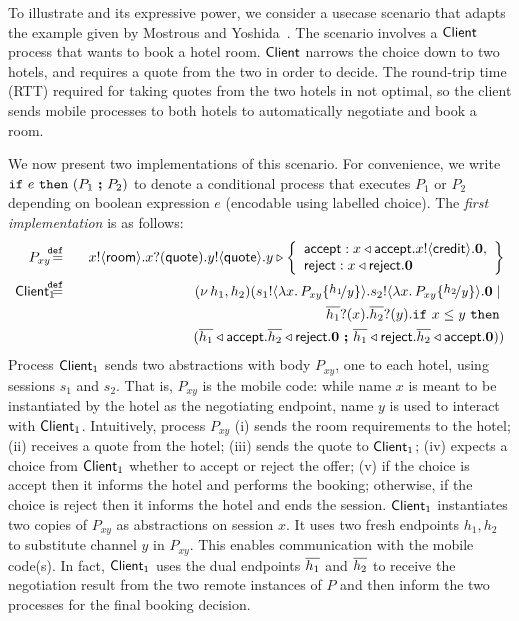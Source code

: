 \begin{example}\label{exam:proc}
To illustrate \HOp and its expressive power, 
we consider a usecase scenario that adapts the example given by Mostrous and Yoshida~\cite{tlca07,MostrousY15}.
The scenario involves a $\mathsf{Client}$ process that wants to book
a hotel room. %
$\mathsf{Client}$
narrows the choice down to two hotels, and requires 
 a quote from the two in order to
decide. The round-trip time (RTT) required for
taking quotes from the two hotels in not optimal, %
so the client sends mobile processes to both hotels
to automatically negotiate and book a room. 

We now present two \HOp implementations of this scenario.
For convenience, we write $\mathtt{if}\  e\ \mathtt{then}\  (P_1\ \boldsymbol{;} \ P_2)$ 
to denote a conditional process that executes $P_1$ or $P_2$ depending on boolean expression $e$ (encodable using labelled choice).
The \emph{first implementation} is  as follows:
%
	\begin{eqnarray*}%
		 P_{xy}  \!\!\! & \defeq &  \!\!\! \bout{x}{\rtype} \binp{x}{\Quote} \bout{y}{\Quote}
		y \triangleright \left\{
				\begin{array}{l}
					\accept: \bsel{x}{\accept} \bout{x}{\creditc} \inact,\\
					\reject: \bsel{x}{\reject} \inact
				\end{array}
				\right\}
		\\ %
		 \Client_1 \!\!\!\!\! & \defeq  &  \!\!\! \newsp{h_1, h_2}{\bout{s_1}{\abs{x}{P_{xy} \subst{h_1}{y}}} \bout{s_2}{\abs{x}{P_{xy} \subst{h_2}{y}}} \inact \Par  \\
		& & 
		\qquad \qquad\binp{\dual{h_1}}{x} \binp{\dual{h_2}}{y}  \If x \leq y\   \Then\\
		& & \qquad\qquad \qquad \qquad (\bsel{\dual{h_1}}{\accept} \bsel{\dual{h_2}}{\reject} \inact \ \Else \ \bsel{\dual{h_1}}{\reject} \bsel{\dual{h_2}}{\accept} \inact )
		}
	\end{eqnarray*}
%
Process $\mathsf{Client}_1$ sends two abstractions with body $P_{xy}$, one to each hotel, 
		using sessions $s_1$ and $s_2$.
		That is, $P_{xy}$ is the mobile code:
	while
		name $x$ is meant to be instantiated by the hotel as the negotiating
		endpoint, name $y$ is used to interact with $\mathsf{Client}_1$.	
		Intuitively, process $P_{xy}$ (i)  sends the room requirements to the hotel;
		(ii) receives a quote from the hotel;
		(iii) sends the quote to  $\mathsf{Client}_1$;
		(iv) expects a choice from   $\mathsf{Client}_1$ whether to accept or reject the offer;
		(v) if the choice is accept then it informs the hotel and performs the booking;
		otherwise, if the choice is reject then it informs the hotel and ends the session.
				$\mathsf{Client}_1$ instantiates two copies of  $P_{xy}$ as abstractions
		on session $x$. It uses two
		fresh endpoints $h_1, h_2$ to substitute channel $y$
		in $P_{xy}$. This enables communication with the mobile code(s).
		In fact, 
		$\mathsf{Client}_1$ uses the dual endpoints $\overline{h_1}$ and $\overline{h_2}$
		to receive the negotiation
		result from the two remote instances of $P$ and then inform the two
		processes for the final booking decision.


\end{example}
